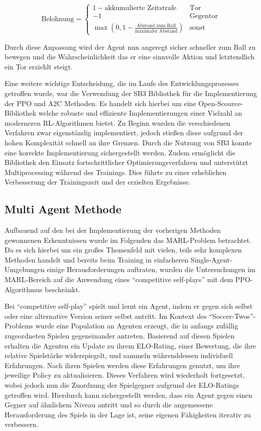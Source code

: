 \documentclass[twocolumn]{webofc}
\begin{document}
\[
\text{Belohnung} = \begin{cases} 
	1 - \text{akkumulierte Zeitstrafe} & \text{Tor} \\
	-1 & \text{Gegentor} \\
	\max\left(0, 1 - \frac{\text{Abstand zum Ball}}{\text{maximaler Abstand}}\right) & \text{sonst}
\end{cases}
\]

Durch diese Anpassung wird der Agent nun angeregt sicher schneller zum Ball zu bewegen und die Wahrscheinlichkeit das er eine sinnvolle Aktion und letztendlich ein Tor erziehlt steigt.

Eine weitere wichtige Entscheidung, die im Laufe des Entwicklungsprozesses getroffen wurde, war die Verwendung der \ac{SB3} Bibliothek \cite{stable-baselines3} für die Implementierung der \ac{PPO} und \ac{A2C} Methoden. Es handelt sich hierbei um eine Open-Scource-Bibliothek welche robuste und effiziente Implementierungen einer Vielzahl an moderneren \ac{RL}-Algorithmen bietet.
Zu Beginn wurden die verschiedenen Verfahren zwar eigenständig implementiert, jedoch stießen diese aufgrund der hohen Komplexität schnell an ihre Grenzen. Durch die Nutzung von \ac{SB3} konnte eine korrekte Implementierung sichergestellt werden. Zudem ermöglicht die Bibliothek den Einsatz fortschrittlicher Optimierungsverfahren und unterstützt Multiprocessing während des Trainings. Dies führte zu einer erheblichen Verbesserung der Trainingszeit und der erzielten Ergebnisse.

\subsection{Multi Agent Methode}

Aufbauend auf den bei der Implementierung der vorherigen Methoden gewonnenen Erkenntnissen wurde im Folgenden das \ac{MARL}-Problem betrachtet. Da es sich hierbei um ein großes Themenfeld mit vielen, teils sehr komplexen Methoden handelt und bereits beim Training in einfacheren Single-Agent-Umgebungen einige Herausforderungen auftraten, wurden die Untersuchungen im \ac{MARL}-Bereich auf die Anwendung eines \enquote{competitive self-plays} mit dem \ac{PPO}-Algorithmus beschränkt.

Bei \enquote{competitive self-play} spielt und lernt ein Agent, indem er gegen sich selbst oder eine alternative Version seiner selbst antritt. Im Kontext des \enquote{Soccer-Twos}-Problems wurde eine Population an Agenten erzeugt, die in anfangs zufällig zugeordneten Spielen gegeneinander antreten. Basierend auf diesen Spielen erhalten die Agenten ein Update zu ihrem ELO-Rating, einer Bewertung, die ihre relative Spielstärke widerspiegelt, und sammeln währenddessen individuell Erfahrungen. Nach ihren Spielen werden diese Erfahrungen genutzt, um ihre jeweilige Policy zu aktualisieren. Dieses Verfahren wird wiederholt fortgesetzt, wobei jedoch nun die Zuordnung der Spielgegner aufgrund der ELO-Ratings getroffen wird. Hierdurch kann sichergestellt werden, dass ein Agent gegen einen Gegner auf ähnlichem Niveau antritt und so durch die angemessene Herausforderung des Spiels in der Lage ist, seine eigenen Fähigkeiten iterativ zu verbessern.
\end{document}
